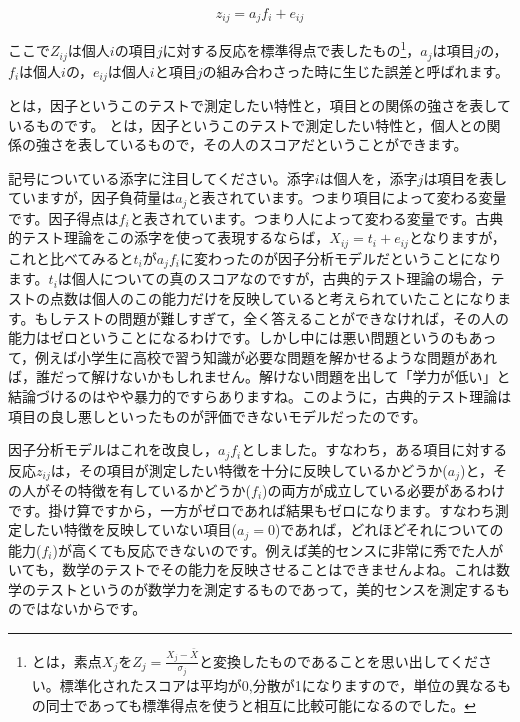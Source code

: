 \documentclass{ltjsbook}
\begin{document}
\[ z_{ij} = a_j f_i + e_{ij} \]

ここで$Z_{ij}$は個人$i$の項目$j$に対する反応を標準得点で表したもの\footnote{とは，素点$X_j$を$Z_j = \frac{X_j - \bar{X}}{\sigma_j}$と変換したものであることを思い出してください。標準化されたスコアは平均が0,分散が1になりますので，単位の異なるもの同士であっても標準得点を使うと相互に比較可能になるのでした。}，$a_j$は項目$j$の，$f_i$は個人$i$の，$e_{ij}$は個人$i$と項目$j$の組み合わさった時に生じた誤差と呼ばれます。

とは，因子というこのテストで測定したい特性と，項目との関係の強さを表しているものです。
とは，因子というこのテストで測定したい特性と，個人との関係の強さを表しているもので，その人のスコアだということができます。

記号についている添字に注目してください。添字$i$は個人を，添字$j$は項目を表していますが，因子負荷量は$a_j$と表されています。つまり項目によって変わる変量です。因子得点は$f_i$と表されています。つまり人によって変わる変量です。古典的テスト理論をこの添字を使って表現するならば，$X_{ij} = t_i + e_{ij}$となりますが，これと比べてみると$t_i$が$a_jf_i$に変わったのが因子分析モデルだということになります。$t_i$は個人についての真のスコアなのですが，古典的テスト理論の場合，テストの点数は個人のこの能力だけを反映していると考えられていたことになります。もしテストの問題が難しすぎて，全く答えることができなければ，その人の能力はゼロということになるわけです。しかし中には悪い問題というのもあって，例えば小学生に高校で習う知識が必要な問題を解かせるような問題があれば，誰だって解けないかもしれません。解けない問題を出して「学力が低い」と結論づけるのはやや暴力的ですらありますね。このように，古典的テスト理論は項目の良し悪しといったものが評価できないモデルだったのです。

因子分析モデルはこれを改良し，$a_j f_i$としました。すなわち，ある項目に対する反応$z_{ij}$は，その項目が測定したい特徴を十分に反映しているかどうか($a_j$)と，その人がその特徴を有しているかどうか($f_i$)の両方が成立している必要があるわけです。掛け算ですから，一方がゼロであれば結果もゼロになります。すなわち測定したい特徴を反映していない項目($a_j=0$)であれば，どれほどそれについての能力($f_i$)が高くても反応できないのです。例えば美的センスに非常に秀でた人がいても，数学のテストでその能力を反映させることはできませんよね。これは数学のテストというのが数学力を測定するものであって，美的センスを測定するものではないからです。
\end{document}

